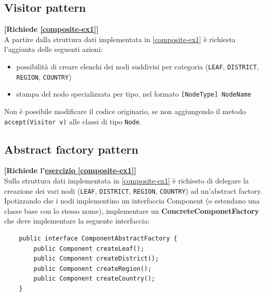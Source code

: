 \documentclass[12pt,a4paper]{article}
\begin{document}
    \subsection{Visitor pattern}\label{pattern:visitors}
    \begin{Exercise}
    \small\textbf{[Richiede \hyperlink{composite-ex1}{\ref{composite-ex1}}]} \\
    A partire dalla struttura dati implementata in \hyperlink{composite-ex1}{\ref{composite-ex1}} è richiesta l'aggiunta delle seguenti azioni:
    \begin{itemize}
        \item possibilità di creare elenchi dei nodi suddivisi per categoria (\texttt{LEAF}, \texttt{DISTRICT}, \texttt{REGION}, \texttt{COUNTRY})
        \item stampa del nodo specializzata per tipo, nel formato \texttt{[NodeType] NodeName}
    \end{itemize}
    Non è possibile modificare il codice originario, se non aggiungendo il metodo \texttt{accept(Visitor v)} alle classi di tipo \texttt{Node}.
    \end{Exercise}
    
    \subsection{Abstract factory pattern}\label{pattern:abstract_factory}
    \begin{Exercise}
    \small\textbf{[Richiede l'\hyperref[composite-ex1]{esercizio \ref{composite-ex1}}]}\\
    Sulla struttura dati implementata in \hyperref[composite-ex1]{\ref{composite-ex1}} è richiesto di delegare la creazione dei vari nodi (\texttt{LEAF}, \texttt{DISTRICT}, \texttt{REGION}, \texttt{COUNTRY}) ad un'abstract factory.
    Ipotizzando che i nodi implementino un interfaccia Component (o estendano una classe base con lo stesso nome), implementare un \textbf{ConcreteComponetFactory} che deve implementare la seguente interfaccia:
    \begin{lstlisting}
    public interface ComponentAbstractFactory {
        public Component createLeaf();
        public Component createDistrict();
        public Component createRegion();
        public Component createCountry();
    }
    \end{lstlisting}
    \end{Exercise}
    
\end{document}
